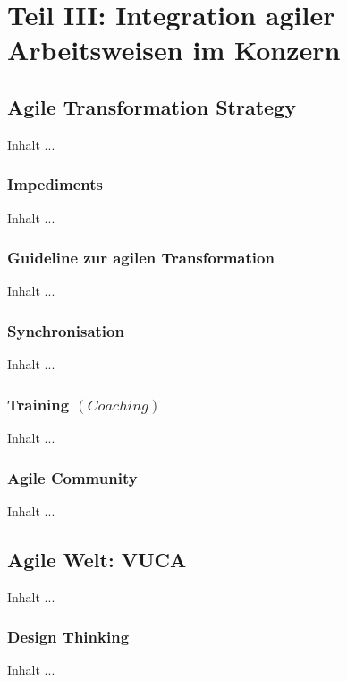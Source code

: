 
\chapter{Teil III: Integration agiler Arbeitsweisen im Konzern}
\minitoc 
\vspace{1 cm} 

\section{Agile Transformation Strategy}
Inhalt ...

\subsection{Impediments}
Inhalt ...

\subsection{Guideline zur agilen Transformation}
Inhalt ...

\subsection{Synchronisation}
Inhalt ...

\subsection{Training $(Coaching)$}
Inhalt ...

\subsection{Agile Community}
Inhalt ...


\section{Agile Welt: VUCA}
Inhalt ...

\subsection{Design Thinking}
Inhalt ...

